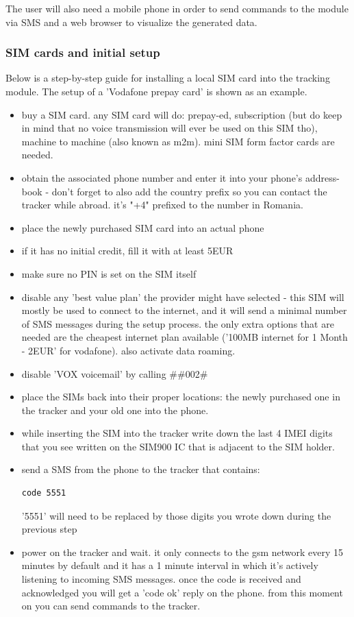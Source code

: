 \documentclass[a4paper,twoside]{refart}
\begin{document}
The user will also need a mobile phone in order to send commands to the module via SMS and a web browser to visualize the generated data.

\subsubsection{SIM cards and initial setup}

Below is a step-by-step guide for installing a local SIM card into the tracking module. The setup of a 'Vodafone prepay card' is shown as an example.

\begin{itemize}
    \item buy a SIM card. any SIM card will do: prepay-ed, subscription (but do keep in mind that no voice transmission will ever be used on this SIM tho), machine to machine (also known as \gls{m2m}). mini SIM form factor cards are needed.
    \item obtain the associated phone number and enter it into your phone's address-book - don't forget to also add the country prefix so you can contact the tracker while abroad. it's "+4" prefixed to the number in Romania.
    \item place the newly purchased SIM card into an actual phone
    \item if it has no initial credit, fill it with at least 5EUR
    \item make sure no PIN is set on the SIM itself
    \item disable any 'best value plan' the provider might have selected - this SIM will mostly be used to connect to the internet, and it will send a minimal number of SMS messages during the setup process. the only extra options that are needed are the cheapest internet plan available ('100MB internet for 1 Month - 2EUR' for vodafone). also activate data roaming.
    \item disable 'VOX voicemail' by calling \#\#002\#
    \item place the SIMs back into their proper locations: the newly purchased one in the tracker and your old one into the phone.
    \item while inserting the SIM into the tracker write down the last 4 IMEI digits that you see written on the SIM900 IC that is adjacent to the SIM holder.
    \item send a SMS from the phone to the tracker that contains:

\begin{lstlisting}
code 5551
\end{lstlisting}

'5551' will need to be replaced by those digits you wrote down during the previous step

    \item power on the tracker and wait. it only connects to the gsm network every 15 minutes by default and it has a 1 minute interval in which it's actively listening to incoming SMS messages. once the code is received and acknowledged you will get a 'code ok' reply on the phone. from this moment on you can send commands to the tracker.
\end{itemize}
\end{document}
